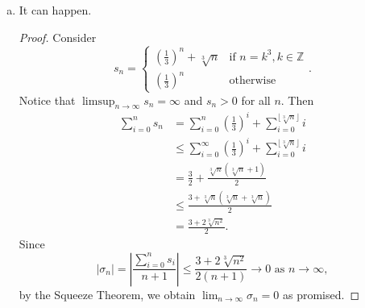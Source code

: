 \begin{Exercise}
\begin{enumerate}[(a)]
\item
\begin{answer}
It can happen.
\end{answer}
\begin{proof}
Consider
$$
s_n = \begin{cases}
\left( \frac{1}{3} \right)^n + \sqrt[3]{n} & \mbox{if } n=k^3, k\in\mathbb{Z} \\
\left( \frac{1}{3} \right)^n & \mbox{otherwise}
\end{cases}.
$$
Notice that $\limsup_{n\to\infty} s_n = \infty$ and $s_n>0$ for all $n$. Then
\begin{align*}
\sum_{i=0}^{n}s_n
&= \sum_{i=0}^{n} \left( \frac{1}{3} \right)^i + \sum_{i=0}^{\lfloor \sqrt[3]{n} \rfloor}i \\
&\leq \sum_{i=0}^{\infty} \left( \frac{1}{3} \right)^i + \sum_{i=0}^{\lfloor \sqrt[3]{n} \rfloor}i \\
&= \frac{3}{2} + \frac{\sqrt[3]{n}(\sqrt[3]{n}+1)}{2} \\
&\leq \frac{3+\sqrt[3]{n}(\sqrt[3]{n}+\sqrt[3]{n})}{2} \\
&= \frac{3+2\sqrt[3]{n^2}}{2}.
\end{align*}
Since
$$
|\sigma_n|
= \left| \frac{\sum_{i=0}^{n}s_i}{n+1} \right|
\leq \frac{3+2\sqrt[3]{n^2}}{2(n+1)} \to 0\text{ as } n\to\infty,
$$
by the Squeeze Theorem, we obtain $\lim_{n\to\infty} \sigma_n = 0$ as promised.
\end{proof}
\end{enumerate}
\end{Exercise}